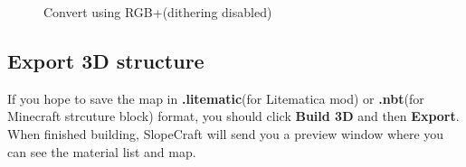 \documentclass{article}
\begin{document}
    \begin{figure}[htbp]
        \centering
        \setcounter{subfigure}{0}
        \caption{Convert using RGB+(dithering disabled)}
    \end{figure}
    
    \subsection{Export 3D structure}
    If you hope to save the map in \textbf{.litematic}(for Litematica mod) or \textbf{.nbt}(for Minecraft strcuture block) format, you should click \textbf{Build 3D} and then \textbf{Export}. When finished building, SlopeCraft will send you a preview window where you can see the material list and map.
\end{document}
